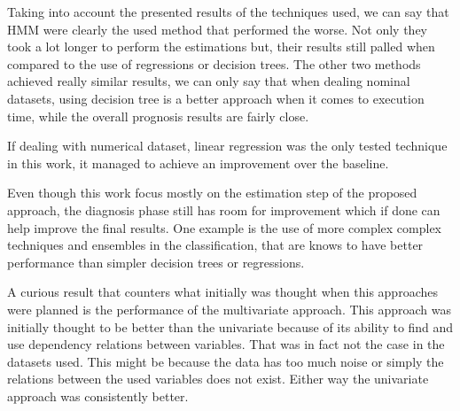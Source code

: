  Taking into account the presented results of the techniques used, we can say that HMM were clearly the used method that performed
  the worse. Not only they took a lot longer to perform the estimations but, their results still palled when compared to the use of 
  regressions or decision trees. The other two methods achieved really similar results, we can only say that when dealing nominal
  datasets, using decision tree is a better approach when it comes to execution time, while the overall prognosis results are fairly close. 
  
  If dealing with numerical dataset, linear regression was the only tested technique in this work, it managed to achieve an improvement 
  over the baseline.
  
  Even though this work focus mostly on the estimation step of the proposed approach, the diagnosis phase still has room for improvement which if done can help improve the final results. One example is the use of more complex complex techniques and ensembles in the classification, that are knows to have better performance than simpler decision trees or regressions.
  
  A curious result that counters what initially was thought when this approaches were planned is the performance of the multivariate approach. This approach was initially thought to be better than the univariate because of its ability to find and use dependency relations between variables. That was in fact not the case in the datasets used. This might be because the data has too much noise or simply the relations between the used variables does not exist. Either way the univariate approach was consistently better.
 
 
\cleardoublepage

